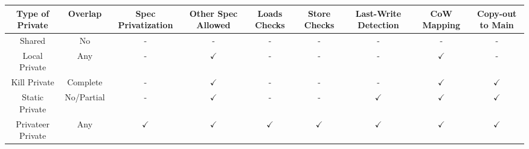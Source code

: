 \centering
\tiny
\begin{tabular}{|c|c|c|c|c|c|c|c|c|}
  \hline
  Type of Private &
  Overlap         &
  Spec Privatization &
  Other Spec Allowed    &
  Loads Checks  &
  Store Checks    &
  Last-Write Detection &
  CoW Mapping &
  Copy-out to Main \\

 \hline
 Shared & No & - & - & - & - & - & - & - \\
 \hline
 Local Private & Any & - & $\checkmark$ & - & - & - & $\checkmark$ & - \\
 \hline
 Kill Private & Complete & - & $\checkmark$ & - & - & - & $\checkmark$ &
$\checkmark$ \\
 \hline
 Static Private & No/Partial & - & $\checkmark$ & - & - &
 $\checkmark$ & $\checkmark$ & $\checkmark$ \\
 \hline
 Privateer Private & Any & $\checkmark$ & $\checkmark$ & $\checkmark$ & $\checkmark$ &
 $\checkmark$ & $\checkmark$ & $\checkmark$ \\
 \hline
\end{tabular}

